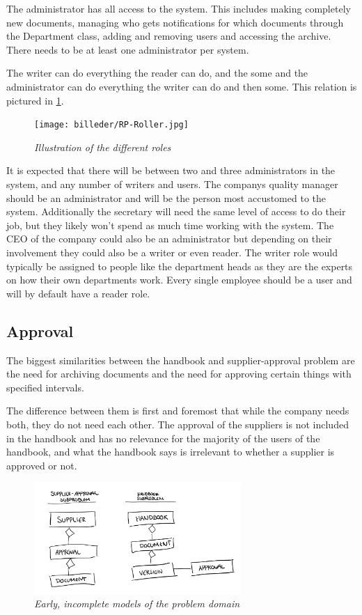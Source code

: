 The administrator has all access to the system. 
This includes making completely new documents, managing who gets notifications for which documents through the Department class, adding and removing users and accessing the archive.
There needs to be at least one administrator per system.

The writer can do everything the reader can do, and the some and the administrator can do everything the writer can do and then some. 
This relation is pictured in \cref{fig:RoleIllustration}.

\begin{figure}[H]
	\centering
	\texttt{[image: billeder/RP-Roller.jpg]}
	\caption{\textit{Illustration of the different roles
	}}
	\label{fig:RoleIllustration}
\end{figure}

It is expected that there will be between two and three administrators in the system, and any number of writers and users. 
The companys quality manager should be an administrator and will be the person most accustomed to the system. 
Additionally the secretary will need the same level of access to do their job, but they likely won't spend as much time working with the system. 
The CEO of the company could also be an administrator but depending on their involvement they could also be a writer or even reader.
The writer role would typically be assigned to people like the department heads as they are the experts on how their own departments work.
Every single employee should be a user and will by default have a reader role. 

\subsection{Approval}
The biggest similarities between the handbook and supplier-approval problem are the need for archiving documents and the need for approving certain things with specified intervals.

The difference between them is first and foremost that while the company needs both, they do not need each other.
The approval of the suppliers is not included in the handbook and has no relevance for the majority of the users of the handbook, and what the handbook says is irrelevant to whether a supplier is approved or not.

\begin{figure}[H]
	\centering
	\includegraphics[width=0.7\textwidth]{billeder/pseudoClassDiagram.jpg}
	\caption{\textit{Early, incomplete models of the problem domain
	}}
	\label{fig:PseudoClassDiagram}
\end{figure}

